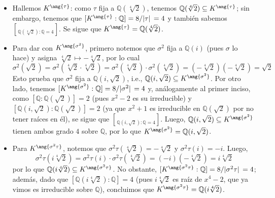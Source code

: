 \begin{sol}
\begin{enumerate}[label=\alph*)]
\begin{itemize}
    \item 
    Hallemos $K^{\ang{\tau}}$: como $\tau$ fija a $\mathbb{Q}(\sqrt[4]{2})$, tenemos $\mathbb{Q}(\sqrt[4]{2}) \subseteq K^{\ang{\tau}}$; sin embargo, tenemos que $\brack{K^{\ang{\tau}}:\mathbb{Q}} = 8/\abs*{\tau} = 4$ y también sabemos $\brack{\mathbb{Q}(\sqrt[4]{2}) : \mathbb{Q}} = 4$. Se sigue que $K^{\ang{\tau}} = \mathbb{Q}(\sqrt[4]{2})$.
    
    \item 
    Para dar con $K^{\ang{\sigma^2}}$, primero notemos que $\sigma^2$ fija a $\mathbb{Q}(i)$ (pues $\sigma$ lo hace) y asigna $\sqrt[4]{2} \mapsto -\sqrt[4]{2}$, por lo cual 
    \[
    \sigma^2(\sqrt{2})=\sigma^2(\sqrt[4]{2}\cdot\sqrt[4]{2}) = \sigma^2(\sqrt[4]{2})\cdot\sigma^2(\sqrt[4]{2}) = (-\sqrt[4]{2})(-\sqrt[4]{2}) = \sqrt{2}
    \]
    Esto prueba que $\sigma^2$ fija a $\mathbb{Q}(i,\sqrt{2})$, i.e., $\mathbb{Q}(i,\sqrt{2}) \subseteq K^{\ang{\sigma^2}}$. Por otro lado, tenemos $[K^{\ang{\sigma^2}}:\mathbb{Q}] = 8/\abs*{\sigma^2} = 4$ y, análogamente al primer inciso, como $[\mathbb{Q}:\mathbb{Q}(\sqrt{2})] = 2$ (pues $x^2-2$ es su irreducible) y $[\mathbb{Q}(i,\sqrt{2}):\mathbb{Q}(\sqrt{2})] = 2$ (ya que $x^2+1$ es irreducible en $\mathbb{Q}(\sqrt{2})$ por no tener raíces en él), se sigue que $\brack{\mathbb{Q}(i,\sqrt{2}) : \mathbb{Q}} = 4$. Luego, $\mathbb{Q}(i,\sqrt{2}) \subseteq K^{\ang{\sigma^2}}$ tienen ambos grado $4$ sobre $\mathbb{Q}$, por lo que $K^{\ang{\sigma^2}} = \mathbb{Q}(i,\sqrt{2})$.

    \item 
    Para $K^{\ang{\sigma^2\tau}}$, notemos que $\sigma^2\tau(\sqrt[4]{2}) = -\sqrt[4]{2}$ y $\sigma^2\tau(i) = -i$. Luego,
    \[
    \sigma^2\tau(i\sqrt[4]{2}) = \sigma^2\tau(i) \cdot \sigma^2\tau(\sqrt[4]{2}) = (-i)(-\sqrt[4]{2}) = i\sqrt[4]{2}
    \]
    por lo que $\mathbb{Q}(i\sqrt[4]{2}) \subseteq K^{\ang{\sigma^2\tau}}$. No obstante, $[K^{\ang{\sigma^2\tau}}:\mathbb{Q}] = 8/\abs*{\sigma^2\tau} = 4$; además, dado que $[\mathbb{Q}(i\sqrt[4]{2}):\mathbb{Q}] = 4$ (pues $i\sqrt[4]{2}$ es raíz de $x^4-2$, que ya vimos es irreducible sobre $\mathbb{Q}$), concluimos que $K^{\ang{\sigma^2\tau}} = \mathbb{Q}(i\sqrt[4]{2})$.


\end{itemize}
\end{enumerate}
\end{sol}
